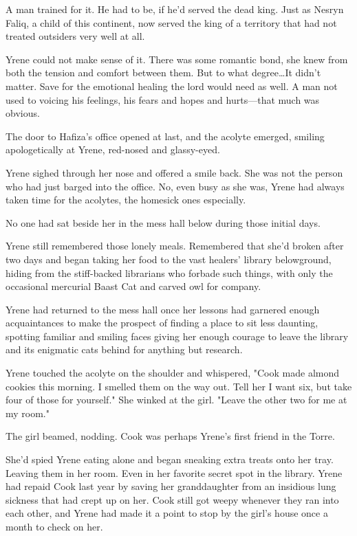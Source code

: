A man trained for it. He had to be, if he'd served the dead king. Just as Nesryn Faliq, a child of this continent, now served the king of a territory that had not treated outsiders very well at all.

Yrene could not make sense of it. There was some romantic bond, she knew from both the tension and comfort between them. But to what degree\ldots It didn't matter. Save for the emotional healing the lord would need as well. A man not used to voicing his feelings, his fears and hopes and hurts---that much was obvious.

The door to Hafiza's office opened at last, and the acolyte emerged, smiling apologetically at Yrene, red-nosed and glassy-eyed.

Yrene sighed through her nose and offered a smile back. She was not the person who had just barged into the office. No, even busy as she was, Yrene had always taken time for the acolytes, the homesick ones especially.

No one had sat beside her in the mess hall below during those initial days.

Yrene still remembered those lonely meals. Remembered that she'd broken after two days and began taking her food to the vast healers' library belowground, hiding from the stiff-backed librarians who forbade such things, with only the occasional mercurial Baast Cat and carved owl for company.

Yrene had returned to the mess hall once her lessons had garnered enough acquaintances to make the prospect of finding a place to sit less daunting, spotting familiar and smiling faces giving her enough courage to leave the library and its enigmatic cats behind for anything but research.

Yrene touched the acolyte on the shoulder and whispered, "Cook made almond cookies this morning. I smelled them on the way out. Tell her I want six, but take four of those for yourself." She winked at the girl. "Leave the other two for me at my room."

The girl beamed, nodding. Cook was perhaps Yrene's first friend in the Torre.

She'd spied Yrene eating alone and began sneaking extra treats onto her tray. Leaving them in her room. Even in her favorite secret spot in the library. Yrene had repaid Cook last year by saving her granddaughter from an insidious lung sickness that had crept up on her. Cook still got weepy whenever they ran into each other, and Yrene had made it a point to stop by the girl's house once a month to check on her.

